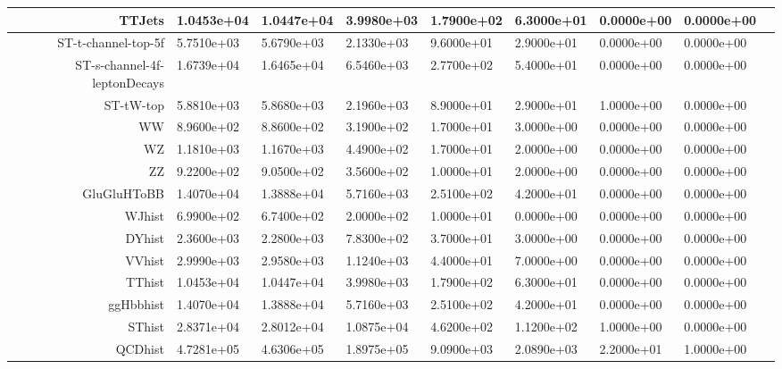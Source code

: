 \documentclass{article}
\begin{document}
\begin{adjustbox}{angle=90}
\begin{tabular}{rllllllll}
 \hline 
TTJets&1.0453e+04&1.0447e+04&3.9980e+03&1.7900e+02&6.3000e+01&0.0000e+00&0.0000e+00\\
 \hline 
ST-t-channel-top-5f&5.7510e+03&5.6790e+03&2.1330e+03&9.6000e+01&2.9000e+01&0.0000e+00&0.0000e+00\\
 \hline 
ST-s-channel-4f-leptonDecays&1.6739e+04&1.6465e+04&6.5460e+03&2.7700e+02&5.4000e+01&0.0000e+00&0.0000e+00\\
 \hline 
ST-tW-top&5.8810e+03&5.8680e+03&2.1960e+03&8.9000e+01&2.9000e+01&1.0000e+00&0.0000e+00\\
 \hline 
WW&8.9600e+02&8.8600e+02&3.1900e+02&1.7000e+01&3.0000e+00&0.0000e+00&0.0000e+00\\
 \hline 
WZ&1.1810e+03&1.1670e+03&4.4900e+02&1.7000e+01&2.0000e+00&0.0000e+00&0.0000e+00\\
 \hline 
ZZ&9.2200e+02&9.0500e+02&3.5600e+02&1.0000e+01&2.0000e+00&0.0000e+00&0.0000e+00\\
 \hline 
GluGluHToBB&1.4070e+04&1.3888e+04&5.7160e+03&2.5100e+02&4.2000e+01&0.0000e+00&0.0000e+00\\
 \hline 
WJhist&6.9900e+02&6.7400e+02&2.0000e+02&1.0000e+01&0.0000e+00&0.0000e+00&0.0000e+00\\
 \hline 
DYhist&2.3600e+03&2.2800e+03&7.8300e+02&3.7000e+01&3.0000e+00&0.0000e+00&0.0000e+00\\
 \hline 
VVhist&2.9990e+03&2.9580e+03&1.1240e+03&4.4000e+01&7.0000e+00&0.0000e+00&0.0000e+00\\
 \hline 
TThist&1.0453e+04&1.0447e+04&3.9980e+03&1.7900e+02&6.3000e+01&0.0000e+00&0.0000e+00\\
 \hline 
ggHbbhist&1.4070e+04&1.3888e+04&5.7160e+03&2.5100e+02&4.2000e+01&0.0000e+00&0.0000e+00\\
 \hline 
SThist&2.8371e+04&2.8012e+04&1.0875e+04&4.6200e+02&1.1200e+02&1.0000e+00&0.0000e+00\\
 \hline 
QCDhist&4.7281e+05&4.6306e+05&1.8975e+05&9.0900e+03&2.0890e+03&2.2000e+01&1.0000e+00\\
\end{tabular}

\end{adjustbox}
\end{document}
